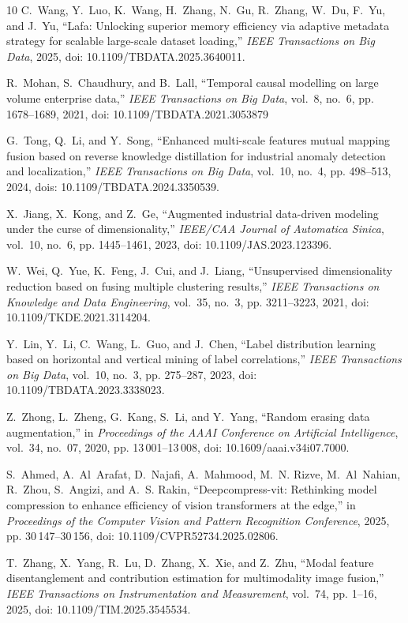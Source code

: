 \documentclass[journal,twoside,web]{ieeecolor}
\begin{document}
\begin{thebibliography}{10}
C.~Wang, Y.~Luo, K.~Wang, H.~Zhang, N.~Gu, R.~Zhang, W.~Du, F.~Yu, and J.~Yu,
  ``Lafa: Unlocking superior memory efficiency via adaptive metadata strategy
  for scalable large-scale dataset loading,'' \emph{IEEE Transactions on Big
  Data}, 2025, doi: 10.1109/TBDATA.2025.3640011.

R.~Mohan, S.~Chaudhury, and B.~Lall, ``Temporal causal modelling on large
  volume enterprise data,'' \emph{IEEE Transactions on Big Data}, vol.~8,
  no.~6, pp. 1678--1689, 2021, doi: 10.1109/TBDATA.2021.3053879

G.~Tong, Q.~Li, and Y.~Song, ``Enhanced multi-scale features mutual mapping
  fusion based on reverse knowledge distillation for industrial anomaly
  detection and localization,'' \emph{IEEE Transactions on Big Data}, vol.~10,
  no.~4, pp. 498--513, 2024, dois: 10.1109/TBDATA.2024.3350539.

X.~Jiang, X.~Kong, and Z.~Ge, ``Augmented industrial data-driven modeling under
  the curse of dimensionality,'' \emph{IEEE/CAA Journal of Automatica Sinica},
  vol.~10, no.~6, pp. 1445--1461, 2023, doi: 10.1109/JAS.2023.123396.

W.~Wei, Q.~Yue, K.~Feng, J.~Cui, and J.~Liang, ``Unsupervised dimensionality
  reduction based on fusing multiple clustering results,'' \emph{IEEE
  Transactions on Knowledge and Data Engineering}, vol.~35, no.~3, pp.
  3211--3223, 2021, doi: 10.1109/TKDE.2021.3114204.

Y.~Lin, Y.~Li, C.~Wang, L.~Guo, and J.~Chen, ``Label distribution learning
  based on horizontal and vertical mining of label correlations,'' \emph{IEEE
  Transactions on Big Data}, vol.~10, no.~3, pp. 275--287, 2023, doi: 10.1109/TBDATA.2023.3338023.

Z.~Zhong, L.~Zheng, G.~Kang, S.~Li, and Y.~Yang, ``Random erasing data
  augmentation,'' in \emph{Proceedings of the AAAI Conference on Artificial
  Intelligence}, vol.~34, no.~07, 2020, pp. 13\,001--13\,008, doi: 10.1609/aaai.v34i07.7000.

S.~Ahmed, A.~Al~Arafat, D.~Najafi, A.~Mahmood, M.~N. Rizve, M.~Al~Nahian,
  R.~Zhou, S.~Angizi, and A.~S. Rakin, ``Deepcompress-vit: Rethinking model
  compression to enhance efficiency of vision transformers at the edge,'' in
  \emph{Proceedings of the Computer Vision and Pattern Recognition Conference},
  2025, pp. 30\,147--30\,156, doi: 10.1109/CVPR52734.2025.02806.

T.~Zhang, X.~Yang, R.~Lu, D.~Zhang, X.~Xie, and Z.~Zhu, ``Modal feature
  disentanglement and contribution estimation for multimodality image fusion,''
  \emph{IEEE Transactions on Instrumentation and Measurement}, vol.~74, pp.
  1--16, 2025, doi: 10.1109/TIM.2025.3545534.

\end{thebibliography}
\end{document}
